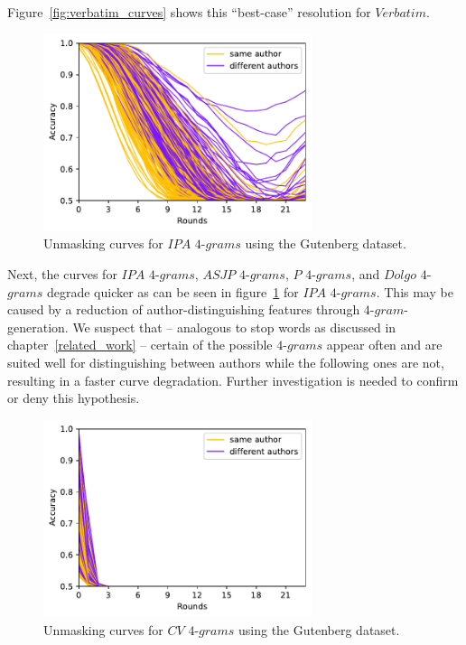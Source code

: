 Figure~\ref{fig:verbatim_curves} shows this ``best-case'' resolution for $Verbatim$.
\begin{figure}
  \centering
  \includegraphics[width=0.7\textwidth]{figures/ipa_4grams_curves}
  \caption{Unmasking curves for $IPA$ $4$-$grams$ using the Gutenberg dataset.}
  \label{fig:ipa_4grams_curves}
\end{figure}
Next, the curves for $IPA$ $4$-$grams$, $ASJP$ $4$-$grams$, $P$ $4$-$grams$, and $Dolgo$ $4$-$grams$ degrade quicker as can be seen in figure~\ref{fig:ipa_4grams_curves} for $IPA$ $4$-$grams$.
This may be caused by a reduction of author-distinguishing features through $4$-$gram$-generation.
We suspect that -- analogous to stop words as discussed in chapter~\ref{related_work} -- certain of the possible $4$-$grams$ appear often and are suited well for distinguishing between authors while the following ones are not, resulting in a faster curve degradation.
Further investigation is needed to confirm or deny this hypothesis.
\begin{figure}
  \centering
  \includegraphics[width=0.7\textwidth]{figures/cv_4grams_curves}
  \caption{Unmasking curves for $CV$ $4$-$grams$ using the Gutenberg dataset.}
  \label{fig:cv_4grams_curves}
\end{figure}
